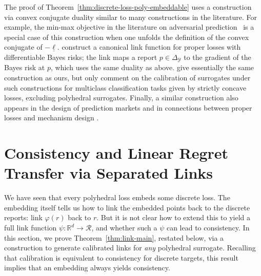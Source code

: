 \documentclass[twoside,11pt]{article}
\newcommand{\Comments}{1}
\newcommand{\mynote}[2]{\ifnum\Comments=1\textcolor{#1}{#2}\fi}
\newcommand{\mytodo}[2]{\ifnum\Comments=1%
  \todo[linecolor=#1!80!black,backgroundcolor=#1,bordercolor=#1!80!black]{#2}\fi}
\newcommand{\raf}[1]{\mynote{darkgreen}{[RF: #1]}}
\newcommand{\raft}[1]{\mytodo{green!20!white}{RF: #1}}
\newcommand{\jessie}[1]{\mynote{teal}{[JF: #1]}}
\newcommand{\reals}{\mathbb{R}}
\newcommand{\simplex}{\Delta_\Y}
\newcommand{\R}{\mathcal{R}}
\newcommand{\Y}{\mathcal{Y}}
\newcommand{\risk}[1]{\underline{#1}}
\begin{document}
The proof of Theorem~\ref{thm:discrete-loss-poly-embeddable} uses a construction via convex conjugate duality similar to many constructions in the literature. 
For example, the min-max objective in the literature on adversarial prediction~\citep{asif2015adversarial,farnia2016minimax,fathony2016adversarial,fathony2018consistent} is a special case of this construction when one unfolds the definition of the convex conjugate of $-\risk \ell$.
\citet{reid2012convexity} construct a canonical link function for proper losses with differentiable Bayes risks; the link maps a report $p\in\simplex$ to the gradient of the Bayes risk at $p$, which uses the same duality as above.
\citet[Proposition 3]{duchi2018multiclass} give essentially the same construction as ours, but only comment on the calibration of surrogates under such constructions for multiclass classification tasks given by strictly concave losses, excluding polyhedral surrogates.
Finally, a similar construction also appears in the design of prediction markets \citep{abernethy2013efficient} and in connections between proper losses and mechanism design \citep{frongillo2014general}.


\section{Consistency and Linear Regret Transfer via Separated Links}
\label{sec:calibration}

We have seen that every polyhedral loss embeds some discrete loss.
The embedding itself tells us how to link the embedded points back to the discrete reports: link $\varphi(r)$ back to $r$.
But it is not clear how to extend this to yield a full link function $\psi: \reals^d \to \R$, and whether such a $\psi$ can lead to consistency.
In this section, we prove Theorem~\ref{thm:link-main}, restated below, via a construction to generate calibrated links for \emph{any} polyhedral surrogate.
Recalling that calibration is equivalent to consistency for discrete targets, this result implies that an embedding always yields consistency.
\end{document}
